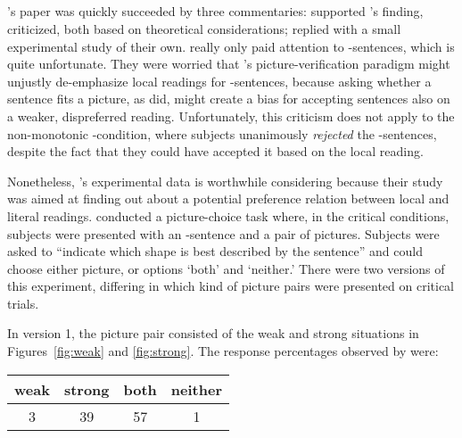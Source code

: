 \documentclass[fleqn,reqno,10pt,draft]{article}
\newcommand{\as}{\acro{as}}
\renewcommand{\es}{\acro{es}}
\begin{document}
\subsection{\citet{CliftonDube2010:Embedded-Implic}}
\label{sec:clifton-dube}

\citeauthor{GeurtsPouscoulous2009:Embedded-Implic}'s paper was quickly
succeeded by three commentaries: \citet{Ippolito2010:Embedded-Implic}
supported \citeauthor{GeurtsPouscoulous2009:Embedded-Implic}'s
finding, \citet{Sauerland2010:Embedded-Implic} criticized, both based
on theoretical considerations; \citet{CliftonDube2010:Embedded-Implic}
replied with a small experimental study of their
own. \citeauthor{CliftonDube2010:Embedded-Implic} really only paid
attention to \as-sentences, which is quite unfortunate. They were
worried that \citeauthor{GeurtsPouscoulous2009:Embedded-Implic}'s
picture-verification paradigm might unjustly de-emphasize local
readings for \as-sentences, because asking whether a sentence fits a
picture, as \citeauthor{GeurtsPouscoulous2009:Embedded-Implic} did,
might create a bias for accepting sentences also on a weaker,
dispreferred reading. Unfortunately, this criticism does not apply to
the non-monotonic \es-condition, where subjects unanimously
\emph{rejected} the \es-sentences, despite the fact that they could
have accepted it based on the local reading.

Nonetheless, \citeauthor{CliftonDube2010:Embedded-Implic}'s
experimental data is worthwhile considering because their study was
aimed at finding out about a potential preference relation between
local and literal
readings. \citeauthor{CliftonDube2010:Embedded-Implic} conducted a
picture-choice task where, in the critical conditions, subjects were
presented with an \as-sentence and a pair of pictures. Subjects were
asked to ``indicate which shape is best described by the
sentence'' and could choose either picture, or options `both'
and `neither.' There were two versions of this experiment, differing
in which kind of picture pairs were presented on critical trials.

In version 1, the picture pair consisted of the weak and strong
situations in Figures~\ref{fig:weak} and
\ref{fig:strong}. The response percentages observed by
\citeauthor{CliftonDube2010:Embedded-Implic} were:

\begin{center}
  \begin{tabular}{cccc}
    weak & strong & both & neither
    \\ \midrule 
 3 & 39 & 57 & 1 
  \end{tabular}
\end{center}
\end{document}
